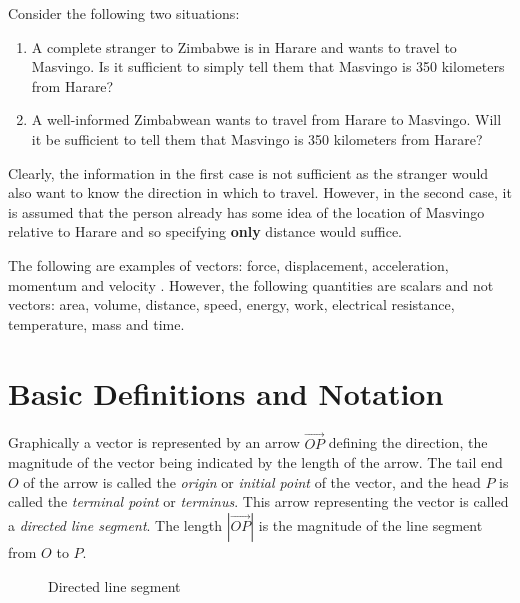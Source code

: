 \documentclass[titlepage,a4paper,12pt]{report}
\begin{document}
\noindent Consider the following two situations:
\begin{enumerate}
\item A complete stranger to Zimbabwe is in Harare and wants to travel to Masvingo. Is it sufficient to simply tell them that Masvingo is 350 kilometers from Harare?
\item A well-informed Zimbabwean wants to travel from Harare to Masvingo. Will it be sufficient to tell them that Masvingo is 350 kilometers from Harare?
\end{enumerate}
Clearly, the information in the first case is not sufficient as the stranger would also want to know the direction in which to travel. However, in the second case, it is assumed that the person already has some idea of the location of Masvingo relative to Harare and so specifying \textbf{only} distance would suffice.

\noindent The following are examples of vectors: force, displacement, acceleration, momentum and  velocity . However, the following quantities are scalars and not vectors: area, volume, distance, speed, energy, work, electrical resistance, temperature, mass and time.

\section{Basic Definitions and Notation}
\noindent Graphically a vector is represented by an arrow $\overrightarrow{OP}$ defining
the direction, the magnitude of the vector being indicated by
the length of the arrow. The tail end $O$ of the arrow is called the
\textit{origin} or \textit{initial point} of the vector, and the head $P$ is called the \textit{terminal point} or \textit{terminus}. This arrow representing the vector is called a \textit{directed line segment}. The length $|\overrightarrow{OP}|$  is the magnitude of the line segment from $O$ to $P$. 
\begin{figure}[h!]

\caption{Directed line segment}
\end{figure}
\end{document}
